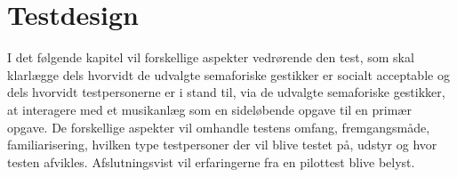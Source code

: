 \chapter{Testdesign}
\label{TestdesignSocialAccept}
%
I det følgende kapitel vil forskellige aspekter vedrørende den test, som skal klarlægge dels hvorvidt de udvalgte semaforiske gestikker er socialt acceptable og dels hvorvidt testpersonerne er i stand til, via de udvalgte semaforiske gestikker, at interagere med et musikanlæg som en sideløbende opgave til en primær opgave. De forskellige aspekter vil omhandle testens omfang, fremgangsmåde, familiarisering, hvilken type testpersoner der vil blive testet på, udstyr og hvor testen afvikles. Afslutningsvist vil erfaringerne fra en pilottest blive belyst.